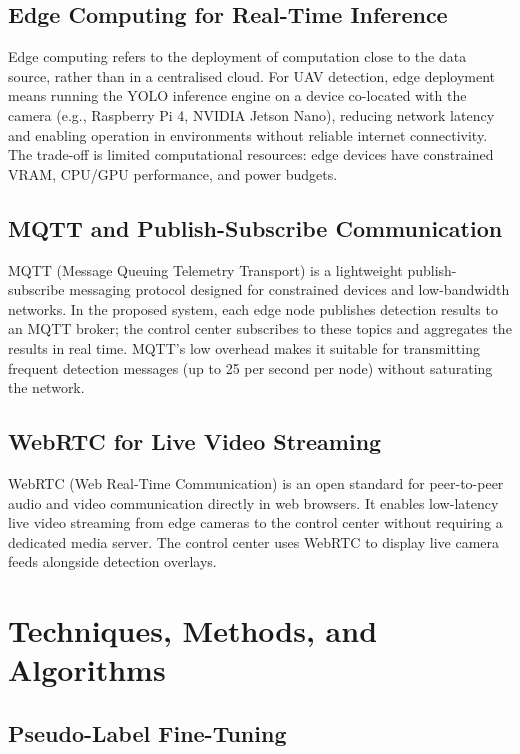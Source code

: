 \documentclass[12pt,a4paper]{report}
\begin{document}
\subsection{Edge Computing for Real-Time Inference}

Edge computing refers to the deployment of computation close to the data
source, rather than in a centralised cloud. For UAV detection, edge
deployment means running the YOLO inference engine on a device co-located
with the camera (e.g., Raspberry Pi 4, NVIDIA Jetson Nano), reducing
network latency and enabling operation in environments without reliable
internet connectivity. The trade-off is limited computational resources:
edge devices have constrained VRAM, CPU/GPU performance, and power budgets.

\subsection{MQTT and Publish-Subscribe Communication}

MQTT (Message Queuing Telemetry Transport) is a lightweight publish-subscribe
messaging protocol designed for constrained devices and low-bandwidth networks.
In the proposed system, each edge node publishes detection results to an MQTT
broker; the control center subscribes to these topics and aggregates the
results in real time. MQTT's low overhead makes it suitable for transmitting
frequent detection messages (up to 25 per second per node) without saturating
the network.

\subsection{WebRTC for Live Video Streaming}

WebRTC (Web Real-Time Communication) is an open standard for peer-to-peer
audio and video communication directly in web browsers. It enables low-latency
live video streaming from edge cameras to the control center without requiring
a dedicated media server. The control center uses WebRTC to display live
camera feeds alongside detection overlays.

\section{Techniques, Methods, and Algorithms}

\subsection{Pseudo-Label Fine-Tuning}
\end{document}
